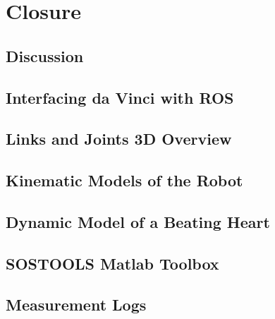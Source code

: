 \part{Closure}\label{part:closure}
\chapter{Discussion}\label{chap:conclusion}


\label{totalpage}

\begingroup
\raggedright
\clearpage
{}

\endgroup
\label{sourceliste}

\newpage


\begin{appendices}
\appendix
\renewcommand{\appendixname}{Appendix}
\renewcommand{\appendixtocname}{Appendix}

\label{appendixbegin}

\chapter{Interfacing da Vinci with ROS}\label{app:ros}


\chapter{Links and Joints 3D Overview}\label{app:links_joints_3d}


\chapter{Kinematic Models of the Robot}\label{app:kinematic_model_robot}


\chapter{Dynamic Model of a Beating Heart}\label{app:dynamic_model_heart}


\chapter{SOSTOOLS Matlab Toolbox}\label{app:sostools}


\chapter{Measurement Logs}\label{app:meas}



\end{appendices}
